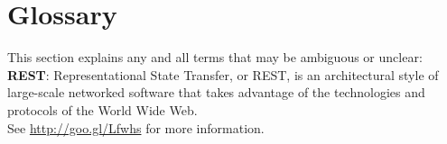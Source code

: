 \documentclass{report}
\begin{document}
	\section{Glossary}
		This section explains any and all terms that may be ambiguous or unclear:\\
		
		\textbf{REST}: Representational State Transfer, or REST, is an architectural style of large-scale networked software that takes advantage of the technologies and protocols of the World Wide Web. \\
See \href{http://goo.gl/Lfwhs}{http://goo.gl/Lfwhs} for more information.



\listoffootnotes \clearpage
\end{document}
